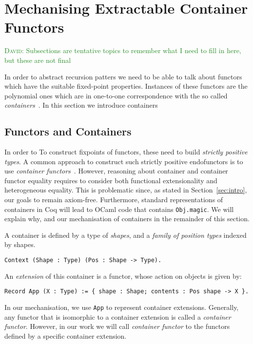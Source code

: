 \documentclass[a4paper, UKenglish, cleveref, autoref, thm-restate]{lipics-v2021}
\newcommand{\dcas}[1]{\textcolor{ForestGreen}{\textsc{David}: #1}}
\newcommand{\R}{\mathbb{R}}
\newcommand{\operator}[1]{\textsf{#1}}
\begin{document}

\section{Mechanising Extractable Container Functors}
\dcas{Subsections are tentative topics to remember what I need to fill in here,
but these are not final}

In order to abstract recursion patters we need to be able to talk about functors
which have the suitable fixed-point properties. Instances of these functors are
the polynomial ones which are in one-to-one correspondence with the so called
\emph{containers}~\cite{AbbottAG05}.
In this section we introduce containers

\subsection{Functors and Containers}
\label{sec:containers}
In order to To construct fixpoints of functors, these need to build
\emph{strictly positive types}. A common approach to construct such strictly
positive endofunctors is to use \emph{container functors}~\cite{AbbottAG05}.
However, reasoning about container and container functor equality requires to
consider both functional extensionality and heterogeneous equality. This is
problematic since, as stated in Section~\ref{sec:intro}, our goals to remain
axiom-free.  Furthermore, standard representations of containers in Coq will
lead to OCaml code that contains \texttt{Obj.magic}. We will explain
why, and our mechanisation of containers in the remainder of this section.

A container is defined by a type of \emph{shapes}, and a \emph{family of
position types} indexed by shapes.
\begin{verbatim}
Context (Shape : Type) (Pos : Shape -> Type).
\end{verbatim}
An \emph{extension} of this container is a functor, whose action on objects is
given by:
\begin{verbatim}
Record App (X : Type) := { shape : Shape; contents : Pos shape -> X }.
\end{verbatim}
In our mechanisation, we use \texttt{App} to represent container
extensions.  Generally, any functor that is isomorphic to a container extension
is called a \emph{container functor}. However, in our work we will call
\emph{container functor} to the functors defined by a specific container
extension.
\end{document}
